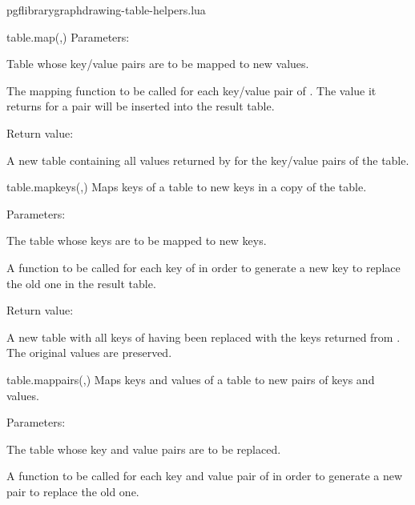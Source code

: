 \begin{filedescription}{pgflibrarygraphdrawing-table-helpers.lua}
\begin{luacommand}{{table.map}(,)}
Parameters:
\begin{parameterdescription}
	\item[\meta{input}] Table whose key/value pairs are to be mapped to new values.\item[\meta{map\_func}] The mapping function to be called for each key/value pair of . The value it returns for a pair will be inserted into the result table. 
\end{parameterdescription}


Return value:
\begin{parameterdescription} 
  \item[] A new table containing all values returned by  for the key/value pairs of the  table. 
\end{parameterdescription}


\end{luacommand}
\begin{luacommand}{{table.map\textunderscore{}keys}(,)}
Maps keys of a table to new keys in a copy of the table. 

Parameters:
\begin{parameterdescription}
	\item[\meta{table}] The table whose keys are to be mapped to new keys.\item[\meta{map\_func}] A function to be called for each key of  in order to generate a new key to replace the old one in the result table. 
\end{parameterdescription}


Return value:
\begin{parameterdescription} 
  \item[] A new table with all keys of  having been replaced with the keys returned from . The original values are preserved. 
\end{parameterdescription}


\end{luacommand}
\begin{luacommand}{{table.map\textunderscore{}pairs}(,)}
Maps keys and values of a table to new pairs of keys and values. 

Parameters:
\begin{parameterdescription}
	\item[\meta{table}] The table whose key and value pairs are to be replaced.\item[\meta{map\_func}] A function to be called for each key and value pair of  in order to generate a new pair to replace the old one. 
\end{parameterdescription}



\end{luacommand}
\end{filedescription}
